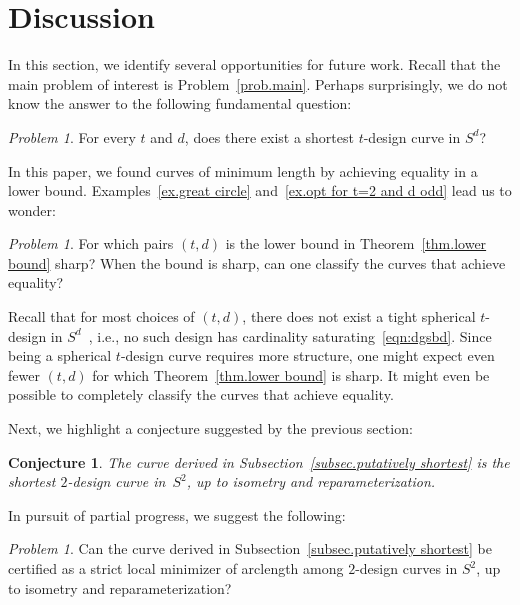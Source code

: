 \documentclass[12pt]{article}
\theoremstyle{plain}
\newtheorem{conj}[thm]{Conjecture}
\theoremstyle{definition}
\theoremstyle{remark}
\newtheorem{prob}[thm]{Problem}
\begin{document}
\section{Discussion}\label{sec:disc}

In this section, we identify several opportunities for future work.
Recall that the main problem of interest is Problem~\ref{prob.main}.
Perhaps surprisingly, we do not know the answer to the following fundamental question:

\begin{prob}
For every $t$ and $d$, does there exist a shortest $t$-design curve in $S^d$? 
\end{prob}

In this paper, we found curves of minimum length by achieving equality in a lower bound.
Examples~\ref{ex.great circle} and~\ref{ex.opt for t=2 and d odd} lead us to wonder:

\begin{prob}\label{prob:thm4tight}
For which pairs $(t,d)$ is the lower bound in Theorem~\ref{thm.lower bound}
sharp?
When the bound is sharp, can one classify the curves that achieve equality?
\end{prob}

Recall that for most choices of $(t,d)$, there does not exist a tight spherical $t$-design in $S^d$~\cite{BannaiD:79,BannaiD:80,BannaiS:81,BannaiMV:05,NebeV:13},  i.e., no such design has cardinality saturating~\eqref{eqn:dgsbd}.
Since being a spherical $t$-design curve requires more structure, one might expect even fewer $(t,d)$ for which Theorem~\ref{thm.lower bound} is sharp.
It might even be possible to completely classify the curves that achieve equality.


Next, we highlight a conjecture suggested by the previous section:

\begin{conj}\label{conj:2S2}
The curve derived in Subsection~\ref{subsec.putatively shortest} is the shortest $2$-design curve in~$S^2$, up to isometry and reparameterization.
\end{conj}

In pursuit of partial progress, we suggest the following:

\begin{prob}
Can the curve derived in Subsection~\ref{subsec.putatively shortest} be certified as
a strict local minimizer of arclength among $2$-design curves in $S^2$, up to isometry and reparameterization?
\end{prob}
\end{document}
